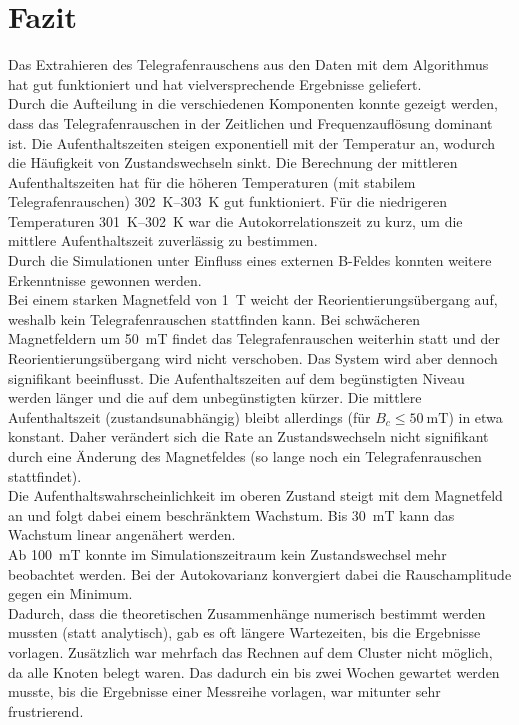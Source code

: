 \documentclass[main.tex]{subfiles}
\begin{document}
\newpage
\section{Fazit}

Das Extrahieren des Telegrafenrauschens aus den Daten mit dem Algorithmus hat gut funktioniert und hat vielversprechende Ergebnisse geliefert.\\

Durch die Aufteilung in die verschiedenen Komponenten konnte gezeigt werden, dass das Telegrafenrauschen in der Zeitlichen und Frequenzauflösung dominant ist.
Die Aufenthaltszeiten steigen exponentiell mit der Temperatur an, wodurch die Häufigkeit von Zustandswechseln sinkt. Die Berechnung der mittleren Aufenthaltszeiten hat für die höheren Temperaturen (mit stabilem Telegrafenrauschen) \SIrange{302}{303}{\kelvin} gut funktioniert. Für die niedrigeren Temperaturen \SIrange{301}{302}{\kelvin} war die Autokorrelationszeit zu kurz, um die mittlere Aufenthaltszeit zuverlässig zu bestimmen.\\

Durch die Simulationen unter Einfluss eines externen B-Feldes konnten weitere Erkenntnisse gewonnen werden.\\
Bei einem starken Magnetfeld von \SI{1}{\tesla} weicht der Reorientierungsübergang auf, weshalb kein Telegrafenrauschen stattfinden kann. Bei schwächeren Magnetfeldern um \SI{50}{\milli\tesla} findet das Telegrafenrauschen weiterhin statt und der Reorientierungsübergang wird nicht verschoben. Das System wird aber dennoch signifikant beeinflusst. Die Aufenthaltszeiten auf dem begünstigten Niveau werden länger und die auf dem unbegünstigten kürzer. Die mittlere Aufenthaltszeit (zustandsunabhängig) bleibt allerdings (für \(B_c \leq \SI{50}{\milli\tesla}\)) in etwa konstant. Daher verändert sich die Rate an Zustandswechseln nicht signifikant durch eine Änderung des Magnetfeldes (so lange noch ein Telegrafenrauschen stattfindet).\\
Die Aufenthaltswahrscheinlichkeit im oberen Zustand steigt mit dem Magnetfeld an und folgt dabei einem beschränktem Wachstum. Bis \SI{30}{\milli\tesla} kann das Wachstum linear angenähert werden.\\ 
Ab \SI{100}{\milli\tesla} konnte im Simulationszeitraum kein Zustandswechsel mehr beobachtet werden. Bei der Autokovarianz konvergiert dabei die Rauschamplitude gegen ein Minimum.\\

Dadurch, dass die theoretischen Zusammenhänge numerisch bestimmt werden mussten (statt analytisch), gab es oft längere Wartezeiten, bis die Ergebnisse vorlagen. Zusätzlich war mehrfach das Rechnen auf dem Cluster nicht möglich, da alle Knoten belegt waren. Das dadurch ein bis zwei Wochen gewartet werden musste, bis die Ergebnisse einer Messreihe vorlagen, war mitunter sehr frustrierend.\\
\end{document}
